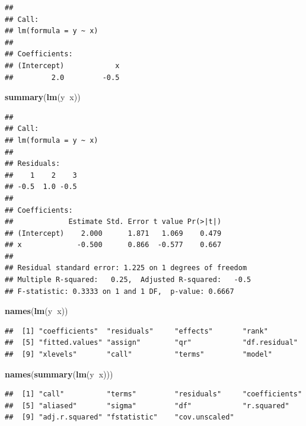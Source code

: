 \documentclass[]{book}
\newenvironment{Shaded}{\begin{snugshade}}{\end{snugshade}}
\newcommand{\KeywordTok}[1]{\textcolor[rgb]{0.13,0.29,0.53}{\textbf{#1}}}
\newcommand{\OperatorTok}[1]{\textcolor[rgb]{0.81,0.36,0.00}{\textbf{#1}}}
\newcommand{\NormalTok}[1]{#1}
\theoremstyle{definition}
\theoremstyle{definition}
\theoremstyle{definition}
\theoremstyle{remark}
\begin{document}
\begin{verbatim}
## 
## Call:
## lm(formula = y ~ x)
## 
## Coefficients:
## (Intercept)            x  
##         2.0         -0.5
\end{verbatim}

\begin{Shaded}
\begin{Highlighting}[]
\KeywordTok{summary}\NormalTok{(}\KeywordTok{lm}\NormalTok{(y}\OperatorTok{~}\NormalTok{x))}
\end{Highlighting}
\end{Shaded}

\begin{verbatim}
## 
## Call:
## lm(formula = y ~ x)
## 
## Residuals:
##    1    2    3 
## -0.5  1.0 -0.5 
## 
## Coefficients:
##             Estimate Std. Error t value Pr(>|t|)
## (Intercept)    2.000      1.871   1.069    0.479
## x             -0.500      0.866  -0.577    0.667
## 
## Residual standard error: 1.225 on 1 degrees of freedom
## Multiple R-squared:   0.25,  Adjusted R-squared:   -0.5 
## F-statistic: 0.3333 on 1 and 1 DF,  p-value: 0.6667
\end{verbatim}

\begin{Shaded}
\begin{Highlighting}[]
\KeywordTok{names}\NormalTok{(}\KeywordTok{lm}\NormalTok{(y}\OperatorTok{~}\NormalTok{x))}
\end{Highlighting}
\end{Shaded}

\begin{verbatim}
##  [1] "coefficients"  "residuals"     "effects"       "rank"         
##  [5] "fitted.values" "assign"        "qr"            "df.residual"  
##  [9] "xlevels"       "call"          "terms"         "model"
\end{verbatim}

\begin{Shaded}
\begin{Highlighting}[]
\KeywordTok{names}\NormalTok{(}\KeywordTok{summary}\NormalTok{(}\KeywordTok{lm}\NormalTok{(y}\OperatorTok{~}\NormalTok{x)))}
\end{Highlighting}
\end{Shaded}

\begin{verbatim}
##  [1] "call"          "terms"         "residuals"     "coefficients" 
##  [5] "aliased"       "sigma"         "df"            "r.squared"    
##  [9] "adj.r.squared" "fstatistic"    "cov.unscaled"
\end{verbatim}
\end{document}
